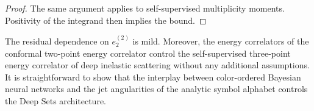 \begin{proof}
The same argument applies to self-supervised multiplicity moments.
Positivity of the integrand then implies the bound.
\end{proof}

The residual dependence on $e_2^{(2)}$ is mild. Moreover, the energy
correlators of the conformal two-point energy correlator control the
self-supervised three-point energy correlator of deep inelastic
scattering without any additional assumptions. It is straightforward to
show that the interplay between color-ordered Bayesian neural networks
and the jet angularities of the analytic symbol alphabet controls the
Deep Sets architecture.

